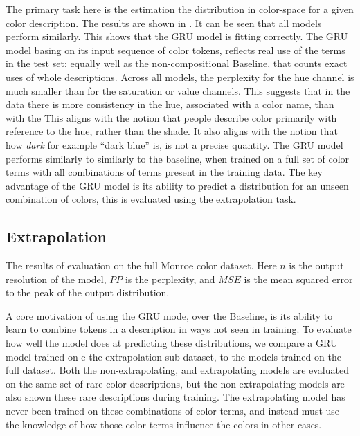 \documentclass[11pt,letterpaper]{article}
\begin{document}
The primary task here is the estimation the distribution in color-space for a given color description.
The results are shown in .
It can be seen that all models perform similarly.
This shows that the GRU model is fitting correctly.
The GRU model basing on its input sequence of color tokens,
reflects real use of the terms in the test set; 
equally well as the non-compositional Baseline, that counts exact uses of whole descriptions.
Across all models, the perplexity for the hue channel is much smaller than for the saturation or value channels.
This suggests that in the data there is more consistency in the hue, associated with a color name, than with the 
This aligns with the notion that people describe color primarily with reference to the hue, rather than the shade.
It also aligns with the notion that how \emph{dark} for example ``dark blue'' is, is not a precise quantity.
The GRU model performs similarly to similarly to the baseline, when trained on a full set of color terms with all combinations of terms present in the training data.
The key advantage of the GRU model is its ability to predict a distribution for an unseen combination of colors, this is evaluated using the extrapolation task.

\subsection{Extrapolation}

\begin{table*}
	\centering
	\caption{\label{tblresextrapo} The results of evaluation on the full Monroe color dataset. Here $n$ is the output resolution of the model, $PP$ is the perplexity, and $MSE$ is the mean squared error to the peak of the output distribution.}
\end{table*}


A core motivation of using the GRU mode, over the Baseline, is its ability to learn to combine tokens in a description in ways not seen in training.
To evaluate how well the model does at predicting these distributions,
we compare a GRU model trained on e the extrapolation sub-dataset, to the models trained on the full dataset.
Both the non-extrapolating, and extrapolating models are evaluated on the same set of rare color descriptions,
but the non-extrapolating models are also shown these rare descriptions during training.
The extrapolating model has never been trained on these combinations of color terms,
and instead must use the knowledge of how those color terms influence the colors in other cases.
\end{document}
